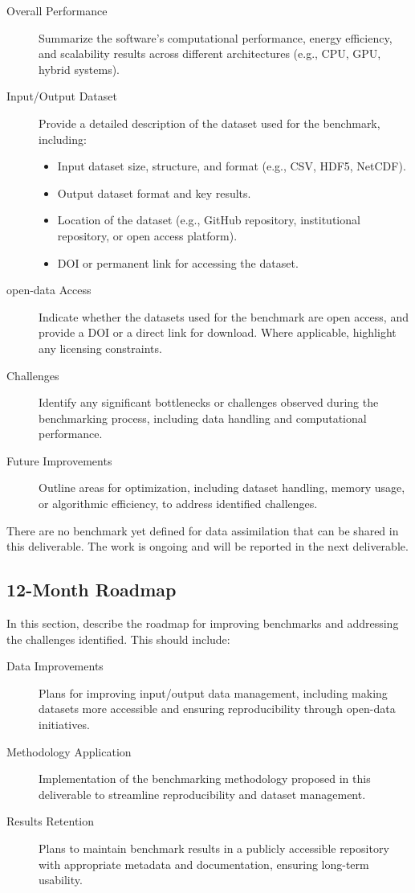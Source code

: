 \begin{description}
    \item[Overall Performance] Summarize the software's computational performance, energy efficiency, and scalability results across different architectures (e.g., CPU, GPU, hybrid systems).
    \item[Input/Output Dataset] Provide a detailed description of the dataset used for the benchmark, including:
        \begin{itemize}
            \item Input dataset size, structure, and format (e.g., CSV, HDF5, NetCDF).
            \item Output dataset format and key results.
            \item Location of the dataset (e.g., GitHub repository, institutional repository, or open access platform).
            \item DOI or permanent link for accessing the dataset.
        \end{itemize}
    \item[open-data Access] Indicate whether the datasets used for the benchmark are open access, and provide a DOI or a direct link for download. Where applicable, highlight any licensing constraints.
    \item[Challenges] Identify any significant bottlenecks or challenges observed during the benchmarking process, including data handling and computational performance.
    \item[Future Improvements] Outline areas for optimization, including dataset handling, memory usage, or algorithmic efficiency, to address identified challenges.
\end{description}

There are no benchmark yet defined for data assimilation that can be shared in this deliverable. The work is ongoing and will be reported in the next deliverable.

\subsection{12-Month Roadmap}
\label{sec:WP4:Feel++:roadmap}

In this section, describe the roadmap for improving benchmarks and addressing the challenges identified. This should include:
\begin{description}
    \item[Data Improvements] Plans for improving input/output data management, including making datasets more accessible and ensuring reproducibility through open-data initiatives.
    \item[Methodology Application] Implementation of the benchmarking methodology proposed in this deliverable to streamline reproducibility and dataset management.
    \item[Results Retention] Plans to maintain benchmark results in a publicly accessible repository with appropriate metadata and documentation, ensuring long-term usability.
\end{description}

